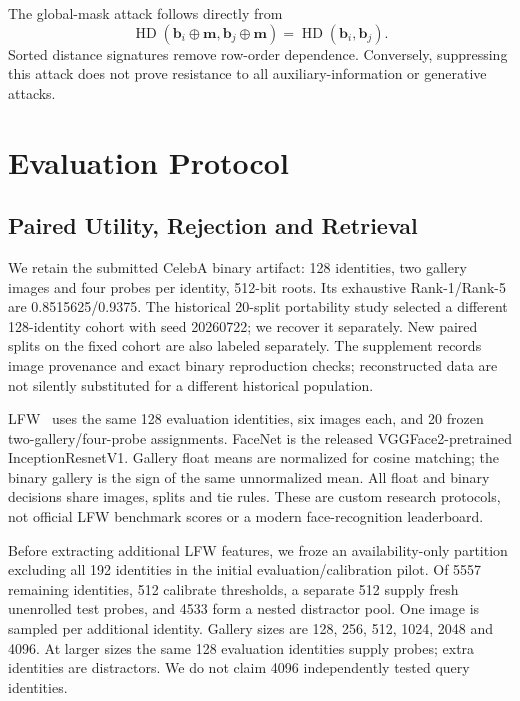 \documentclass[journal]{IEEEtran}
\newcommand{\HD}{\operatorname{HD}}
\begin{document}
The global-mask attack follows directly from
\begin{equation}
\HD(\mathbf b_i\oplus\mathbf m,\mathbf b_j\oplus\mathbf m)
=\HD(\mathbf b_i,\mathbf b_j).
\end{equation}
Sorted distance signatures remove row-order dependence. Conversely, suppressing this attack does not prove resistance to all auxiliary-information or generative attacks.

\section{Evaluation Protocol}
\subsection{Paired Utility, Rejection and Retrieval}
We retain the submitted CelebA binary artifact: 128 identities, two gallery images and four probes per identity, 512-bit roots. Its exhaustive Rank-1/Rank-5 are 0.8515625/0.9375. The historical 20-split portability study selected a different 128-identity cohort with seed 20260722; we recover it separately. New paired splits on the fixed cohort are also labeled separately. The supplement records image provenance and exact binary reproduction checks; reconstructed data are not silently substituted for a different historical population.

LFW~\cite{huang2007lfw} uses the same 128 evaluation identities, six images each, and 20 frozen two-gallery/four-probe assignments. FaceNet is the released VGGFace2-pretrained InceptionResnetV1. Gallery float means are normalized for cosine matching; the binary gallery is the sign of the same unnormalized mean. All float and binary decisions share images, splits and tie rules. These are custom research protocols, not official LFW benchmark scores or a modern face-recognition leaderboard.

Before extracting additional LFW features, we froze an availability-only partition excluding all 192 identities in the initial evaluation/calibration pilot. Of 5557 remaining identities, 512 calibrate thresholds, a separate 512 supply fresh unenrolled test probes, and 4533 form a nested distractor pool. One image is sampled per additional identity. Gallery sizes are 128, 256, 512, 1024, 2048 and 4096. At larger sizes the same 128 evaluation identities supply probes; extra identities are distractors. We do not claim 4096 independently tested query identities.
\end{document}
